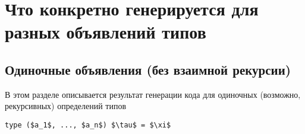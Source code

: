 \documentclass[acmsmall,review,anonymous]{acmart}\settopmatter{printfolios=true,printccs=false,printacmref=false}
\begin{document}
% 
% 

\section{Что конкретно генерируется для разных объявлений типов}

\subsection{Одиночные объявления (без взаимной рекурсии) }
В этом разделе описывается результат генерации кода для одиночных (возможно, рекурсивных) определений типов

\lstinline{type ($a_1$, ..., $a_n$) $\tau$ = $\xi$}
\end{document}
